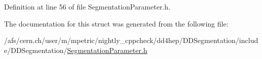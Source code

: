 Definition at line 56 of file SegmentationParameter.h.

The documentation for this struct was generated from the following file:\begin{DoxyCompactItemize}
\item 
/afs/cern.ch/user/m/mpetric/nightly\_\-cppcheck/dd4hep/DDSegmentation/include/DDSegmentation/\hyperlink{_segmentation_parameter_8h}{SegmentationParameter.h}\end{DoxyCompactItemize}
